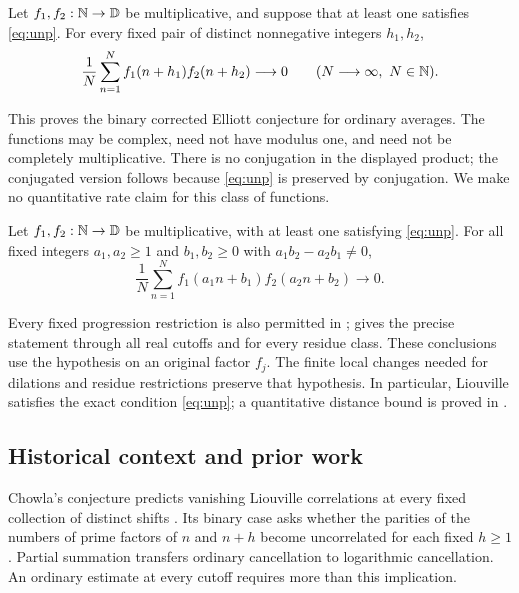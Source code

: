 \begin{theorem}\label{thm:elliott}
Let \(f_1,f_2:\mathbb N\to\mathbb D\) be multiplicative, and suppose that
at least one satisfies \eqref{eq:unp}. For every fixed pair of distinct
nonnegative integers \(h_1,h_2\),
\[
 \frac1N\sum_{n=1}^N f_1(n+h_1)f_2(n+h_2)\longrightarrow0
 \qquad(N\longrightarrow\infty,\ N\in\mathbb N).
\]
\end{theorem}

This proves the binary corrected Elliott conjecture for ordinary
averages. The functions may be complex, need not have modulus one,
and need not be completely multiplicative. There is no conjugation
in the displayed product; the conjugated version follows because
\eqref{eq:unp} is preserved by conjugation. We make no quantitative
rate claim for this class of functions.

\begin{corollary}\label{cor:affine}
Let \(f_1,f_2:\mathbb N\to\mathbb D\) be multiplicative, with at least one
satisfying \eqref{eq:unp}. For all fixed integers \(a_1,a_2\ge1\) and
\(b_1,b_2\ge0\) with \(a_1b_2-a_2b_1\ne0\),
\[
 \frac1N\sum_{n=1}^N f_1(a_1n+b_1)f_2(a_2n+b_2)
 \longrightarrow0.
\]
\end{corollary}

Every fixed progression restriction is also permitted in
;  gives the precise
statement through all real cutoffs and for every residue class.
These conclusions use the hypothesis on an original factor \(f_j\).
The finite local changes needed for dilations and residue restrictions
preserve that hypothesis. In particular, Liouville satisfies the exact
condition \eqref{eq:unp}; a quantitative distance bound is proved in
.

\subsection{Historical context and prior work}

Chowla's conjecture predicts vanishing Liouville correlations at every
fixed collection of distinct shifts \cite{Chowla65,MRT15}. Its binary
case asks whether the parities of the numbers of prime factors of
\(n\) and \(n+h\) become uncorrelated for each fixed \(h\ge1\).
Partial summation transfers ordinary cancellation to logarithmic
cancellation. An ordinary estimate at every cutoff requires more
than this implication.

